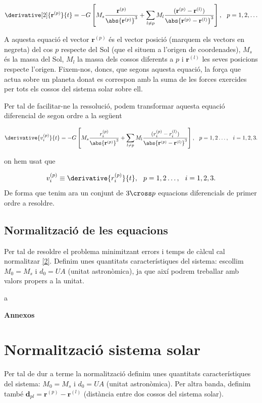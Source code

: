 \documentclass[10pt, twoside]{article}
\begin{document}
\begin{equation}
    \derivative[2]{\mathbf{r}^{(p)}}{t} = - G \left[ M_s \frac{\mathbf{r}^{(p)}}{\abs{
    \mathbf{r}^{(p)}}^3} + \sum_{l \neq p} M_l \frac{(\mathbf{r}^{(p)}-\mathbf{r}^{(l)})}{\abs{\mathbf{r}^{(p)} - \mathbf{r}^{(l)}}^3}\right], \hspace{0.25cm} p = 1, 2, \ldots 
\end{equation}

A aquesta equació el vector $\mathbf{r}^{(p)}$ és el vector posició (marquem els vectors en negreta) del cos $p$ respecte del Sol (que el situem a l'origen de coordenades), $M_s$ és la massa del Sol, $M_l$ la massa dels cossos diferents a $p$ i $\mathbf{r}^{(l)}$ les seves posicions respecte l'origen. Fixem-nos, doncs, que segons aquesta equació, la força que actua sobre un planeta donat es correspon amb la suma de les forces exercides per tots els cossos del sistema solar sobre ell. 

Per tal de facilitar-ne la ressolució, podem transformar aquesta equació diferencial de segon ordre a la següent

\begin{equation}
    \derivative{v_i^{(p)}}{t} = -G \left[ M_s \frac{r_i^{(p)}}{\abs{
        \mathbf{r}^{(p)}}^3} + \sum_{l \neq p} M_l\frac{(r_i^{(p)}-r_i^{(l)})}{\abs{\mathbf{r}^{(p)} - \mathbf{r}^{(l)}}^3} \right], \hspace{0.25cm} p = 1,2 \ldots, \hspace{0.25cm} i = 1,2,3. \label{2}
\end{equation}

on hem usat que

\begin{equation}
    v_i^{(p)} \equiv \derivative{r_i^{(p)}}{t}, \hspace{0.25cm} p = 1,2 \ldots, \hspace{0.25cm} i = 1,2,3.
\end{equation}
De forma que tenim ara un conjunt de $3 \cross p$ equacions diferencials de primer ordre a resoldre.

\subsection{Normalització de les equacions}
Per tal de resoldre el problema minimitzant errors i temps de càlcul cal normalitzar \eqref{2}. Definim unes quantitats característiques del sistema: escollim $M_0 = M_s$ i $d_0 = UA$ (unitat astronòmica), ja que així podrem treballar amb valors propers a la unitat.

\newpage
\begin{thebibliography}
    a
\end{thebibliography}

\newpage
\appendix
{\Huge{\textbf{Annexos}}}
\section{Normalització sistema solar}
Per tal de dur a terme la normalització definim unes quantitats característiques del sistema: $M_0 = M_s$ i $d_0 = UA$ (unitat astronòmica). Per altra banda, definim també $\mathbf{d}_{pl} = \mathbf{r}^{(p)}-\mathbf{r}^{(l)}$ (distància entre dos cossos del sistema solar).
\end{document}
